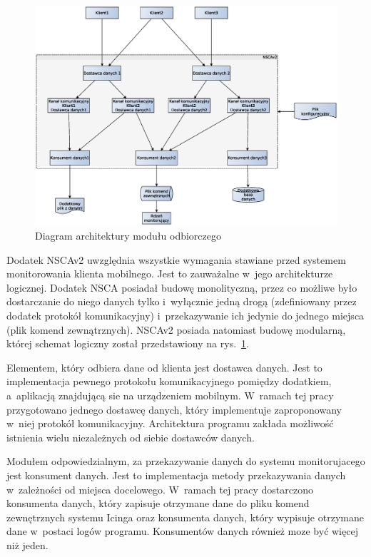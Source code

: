 \begin{figure}[ht]
  \caption{Diagram architektury modułu odbiorczego}
  \label{fig:odbiorczy}
  \centering
\includegraphics[width=1\textwidth]{img/odbiorczy}
\end{figure}

Dodatek NSCAv2 uwzględnia wszystkie wymagania stawiane przed systemem
monitorowania klienta mobilnego. Jest to zauważalne w~jego
architekturze logicznej. Dodatek NSCA posiadał budowę monolityczną,
przez co możliwe było dostarczanie do niego danych tylko i~wyłącznie
jedną drogą (zdefiniowany przez dodatek protokół komunikacyjny)
i~przekazywanie ich jedynie do jednego miejsca (plik komend
zewnątrznych). NSCAv2 posiada natomiast budowę modularną, której
schemat logiczny został przedstawiony na rys.~\ref{fig:odbiorczy}.

Elementem, który odbiera dane od klienta jest dostawca danych. Jest to
implementacja pewnego protokołu komunikacyjnego pomiędzy dodatkiem,
a~aplikacją znajdującą sie na urządzeniem mobilnym. W~ramach tej pracy
przygotowano jednego dostawcę danych, który implementuje zaproponowany
w~niej protokół komunikacyjny. Architektura programu zakłada możliwość
istnienia wielu niezależnych od siebie dostawców danych.

Modułem odpowiedzialnym, za przekazywanie danych do systemu
monitorujacego jest konsument danych. Jest to implementacja metody
przekazywania danych w~zależności od miejsca docelowego. W~ramach tej
pracy dostarczono konsumenta danych, który zapisuje otrzymane dane do
pliku komend zewnętrznych systemu Icinga oraz konsumenta danych, który
wypisuje otrzymane dane w~postaci logów programu. Konsumentów danych
również moze być więcej niż jeden.

